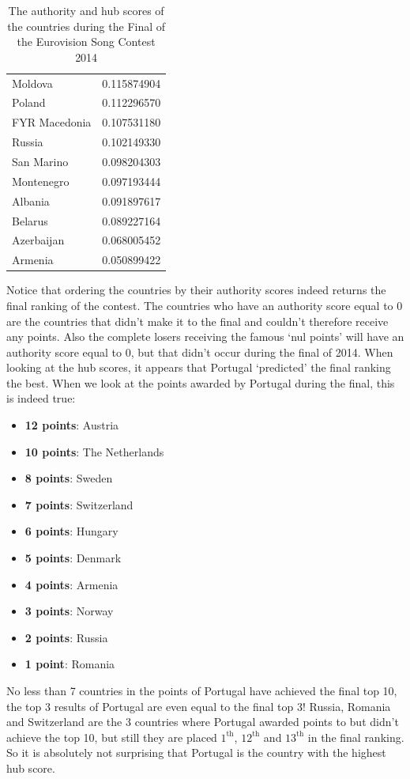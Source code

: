 \documentclass[a4paper,11pt]{report}
\begin{document}
\begin{table}[h!]
\begin{tabular}{l|r}
Moldova         & 0.115874904 \\
Poland          & 0.112296570  \\
FYR Macedonia   & 0.107531180  \\
Russia          & 0.102149330  \\
San Marino      & 0.098204303 \\
Montenegro      & 0.097193444 \\
Albania         & 0.091897617 \\
Belarus         & 0.089227164 \\
Azerbaijan      & 0.068005452 \\
Armenia         & 0.050899422
\end{tabular}

\caption{The authority and hub scores of the countries during the Final of the Eurovision Song Contest 2014}
\end{table}\label{t2014}

Notice that ordering the countries by their authority scores indeed returns the final ranking of the contest. The countries who have an
authority score equal to 0 are the countries that didn't make it to the final and couldn't therefore 
receive any points. Also the complete losers receiving the famous `nul points' will have an authority score
equal to 0, but that didn't occur during the final of 2014. When looking at the hub scores, it appears that Portugal `predicted' the 
final ranking the best. When we look at the points awarded by Portugal during 
the final, this is indeed true:
\begin{itemize}
  \itemsep0em

  \item \textbf{12 points}: Austria
\item \textbf{10 points}: The Netherlands
\item \textbf{8 points}: Sweden
\item \textbf{7 points}: Switzerland	
\item \textbf{6 points}: Hungary
\item \textbf{5 points}: Denmark
\item \textbf{4 points}: Armenia	
\item \textbf{3 points}: Norway
\item \textbf{2 points}: Russia
\item \textbf{1 point}: Romania
\end{itemize}
No less than 7 countries in the points of Portugal have achieved the final top 
10, the top 3 results of Portugal are even equal to the final top 3! Russia, Romania and
Switzerland are the 3 countries where Portugal awarded points to but didn't achieve the 
top 10, but still they are placed $1^\text{th}$, $12^\text{th}$ and 
$13^\text{th}$ in the final ranking. So it is absolutely not surprising that Portugal is the country 
with the highest hub score. 
\end{document}
